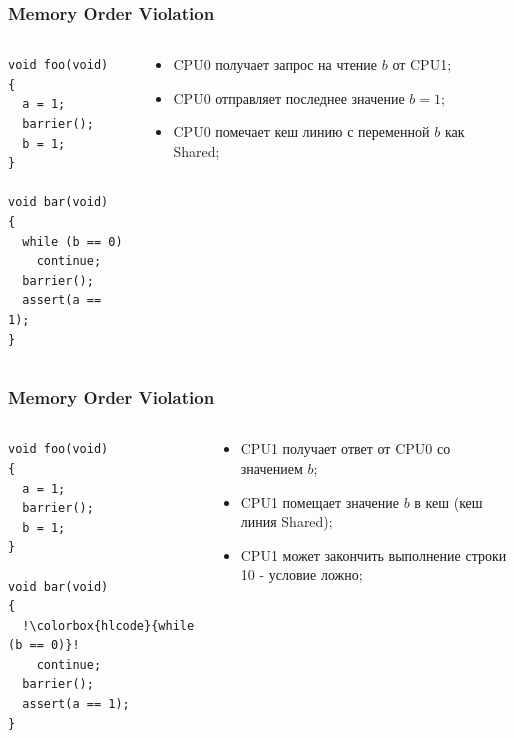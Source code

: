 \begin{frame}[fragile]
\frametitle{Memory Order Violation}

\begin{columns}[T]
  \begin{column}{.4\linewidth}
    \begin{lstlisting}[escapechar=!]
void foo(void)
{
  a = 1;
  barrier();
  b = 1;
}

void bar(void)
{
  while (b == 0)
    continue;
  barrier();
  assert(a == 1);
}
    \end{lstlisting}
  \end{column}
  \begin{column}{.6\linewidth}
    \begin{itemize}
      \item CPU0 получает запрос на чтение $b$ от CPU1;
      \item CPU0 отправляет последнее значение $b = 1$;
      \item CPU0 помечает кеш линию с переменной $b$ как Shared;
    \end{itemize}
  \end{column}
\end{columns}
\end{frame}

\begin{frame}[fragile]
\frametitle{Memory Order Violation}

\begin{columns}[T]
  \begin{column}{.4\linewidth}
    \begin{lstlisting}[escapechar=!]
void foo(void)
{
  a = 1;
  barrier();
  b = 1;
}

void bar(void)
{
  !\colorbox{hlcode}{while (b == 0)}!
    continue;
  barrier();
  assert(a == 1);
}
    \end{lstlisting}
  \end{column}
  \begin{column}{.6\linewidth}
    \begin{itemize}
      \item CPU1 получает ответ от CPU0 со значением $b$;
      \item CPU1 помещает значение $b$ в кеш (кеш линия Shared);
      \item CPU1 может закончить выполнение строки 10 - условие ложно;
    \end{itemize}
  \end{column}
\end{columns}
\end{frame}

